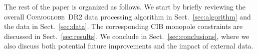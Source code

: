 \documentclass{aa}
\def\Planck{\textit{Planck}}
\newcommand{\cosmoglobe}{\textsc{Cosmoglobe}}
\begin{document}








The rest of the paper is organized as follows.
We start by briefly reviewing the overall \cosmoglobe\ DR2 data processing algorithm in Sect.~\ref{sec:algorithm} and the data in Sect.~\ref{sec:data}. The corresponding CIB monopole constraints are discussed in Sect.~\ref{sec:results}. We conclude in Sect.~\ref{sec:conclusions}, where we also discuss both potential future improvements and the impact of external data.





\end{document}
